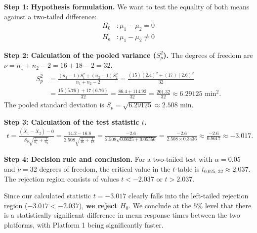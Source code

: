 \begin{solucion}
	\textbf{Step 1: Hypothesis formulation.}
	We want to test the equality of both means against a two-tailed difference:
	\begin{align}
		H_0&: \mu_1 - \mu_2 = 0 \\
		H_a&: \mu_1 - \mu_2 \neq 0
	\end{align}
	
	\textbf{Step 2: Calculation of the pooled variance ($S_p^2$).}
	The degrees of freedom are $\nu = n_1 + n_2 - 2 = 16 + 18 - 2 = 32$.
	\begin{align}
		S_p^2 &= \frac{(n_1 - 1)S_1^2 + (n_2 - 1)S_2^2}{n_1 + n_2 - 2} = \frac{(15)(2.4)^2 + (17)(2.6)^2}{32} \\
		&= \frac{15(5.76) + 17(6.76)}{32} = \frac{86.4 + 114.92}{32} = \frac{201.32}{32} \approx 6.29125 \text{ min}^2.
	\end{align}
	The pooled standard deviation is $S_p = \sqrt{6.29125} \approx 2.508$ min.
	
	\textbf{Step 3: Calculation of the test statistic $t$.}
	\begin{align}
		t = \frac{(\bar{X}_1 - \bar{X}_2) - 0}{S_p \sqrt{\frac{1}{n_1} + \frac{1}{n_2}}} = \frac{14.2 - 16.8}{2.508 \sqrt{\frac{1}{16} + \frac{1}{18}}} = \frac{-2.6}{2.508 \sqrt{0.0625 + 0.05556}} = \frac{-2.6}{2.508 \times 0.3436} \approx \frac{-2.6}{0.8617} \approx -3.017.
	\end{align}
	
	\textbf{Step 4: Decision rule and conclusion.}
	For a two-tailed test with $\alpha = 0.05$ and $\nu = 32$ degrees of freedom, the critical value in the $t$-table is $t_{0.025, \, 32} \approx 2.037$.
	The rejection region consists of values $t < -2.037$ or $t > 2.037$.
	
	Since our calculated statistic $t = -3.017$ clearly falls into the left-tailed rejection region ($-3.017 < -2.037$), \textbf{we reject $H_0$}. We conclude at the $5\%$ level that there is a statistically significant difference in mean response times between the two platforms, with Platform 1 being significantly faster.
\end{solucion}

